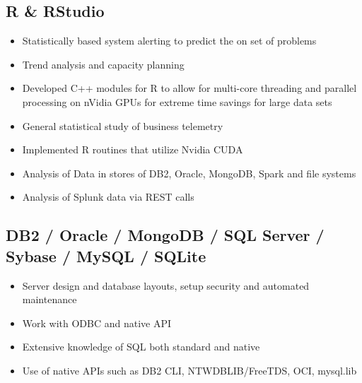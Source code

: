 \documentclass[10pt]{report}
\begin{document}
\subsection*{R \& RStudio}
\begin{itemize}
\item Statistically based system alerting to predict the on set of problems 
\item Trend analysis and capacity planning
\item Developed C++ modules for R to allow for multi-core threading and parallel processing on nVidia GPUs for extreme time savings for large data sets
\item General statistical study of business telemetry
\item Implemented R routines that utilize Nvidia CUDA
\item Analysis of Data in stores of DB2, Oracle, MongoDB, Spark and file systems
\item Analysis of Splunk data via REST calls
\end{itemize}

\subsection*{DB2 / Oracle / MongoDB / SQL Server / Sybase / MySQL / SQLite}
\begin{itemize}
	\item Server design and database layouts, setup security and automated maintenance
	\item Work with ODBC and native API
	\item Extensive knowledge of SQL both standard and native
	\item Use of native APIs such as DB2 CLI, NTWDBLIB/FreeTDS, OCI, mysql.lib
\end{itemize}

\end{document}
